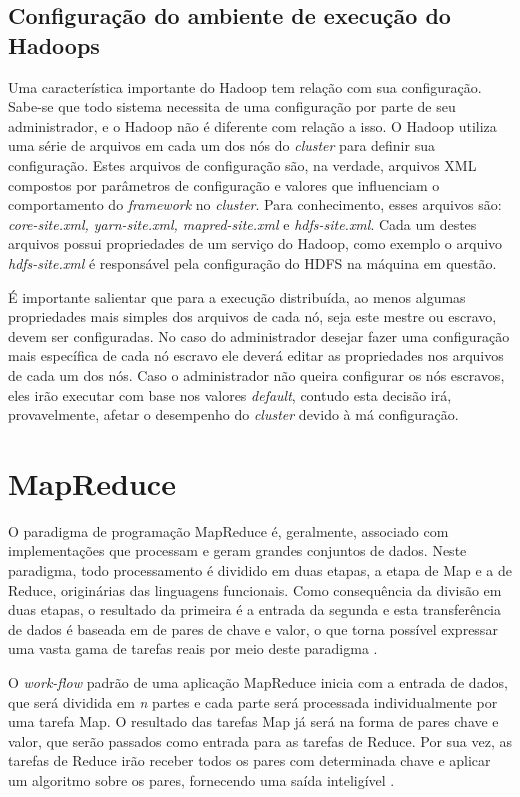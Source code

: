 \subsection{Configuração do ambiente de execução do Hadoops}
Uma característica importante do Hadoop tem relação com sua configuração. Sabe-se que todo sistema necessita de uma configuração por parte de seu administrador, e o Hadoop não é diferente com relação a isso. O Hadoop utiliza uma série de arquivos em cada um dos nós do \textit{cluster} para definir sua configuração. Estes arquivos de configuração são, na verdade, arquivos XML compostos por parâmetros de configuração e valores que influenciam o comportamento do \textit{framework} no \textit{cluster}. Para conhecimento, esses arquivos são: \textit{core-site.xml, yarn-site.xml, mapred-site.xml} e \textit{hdfs-site.xml}. Cada um destes arquivos possui propriedades de um serviço do Hadoop, como exemplo o arquivo \textit{hdfs-site.xml} é responsável pela configuração do HDFS na máquina em questão. 

É importante salientar que para a execução distribuída, ao menos algumas propriedades mais simples dos arquivos de cada nó, seja este mestre ou escravo, devem ser configuradas. No caso do administrador desejar fazer uma configuração mais específica de cada nó escravo ele deverá editar as propriedades nos arquivos de cada um dos nós. Caso o administrador não queira configurar os nós escravos, eles irão executar com base nos valores \textit{default}, contudo esta decisão irá, provavelmente, afetar o desempenho do \textit{cluster} devido à má configuração.

\section{MapReduce}
O paradigma de programação MapReduce é, geralmente, associado com implementações que processam e geram grandes conjuntos de dados. Neste paradigma, todo processamento é dividido em duas etapas, a etapa de Map e a de Reduce, originárias das linguagens funcionais. Como consequência da divisão em duas etapas, o resultado da primeira é a entrada da segunda e esta transferência de dados é baseada em de pares de chave e valor, o que torna possível expressar uma vasta gama de tarefas reais por meio deste paradigma \cite{Dean}.

O \textit{work-flow} padrão de uma aplicação MapReduce inicia com a entrada de dados, que será dividida em \textit{n} partes e cada parte será processada individualmente por uma tarefa Map. O resultado das tarefas Map já será na forma de pares chave e valor, que serão passados como entrada para as tarefas de Reduce. Por sua vez, as tarefas de Reduce irão receber todos os pares com determinada chave e aplicar um algoritmo sobre os pares, fornecendo uma saída inteligível \cite{BookHadoop}.

